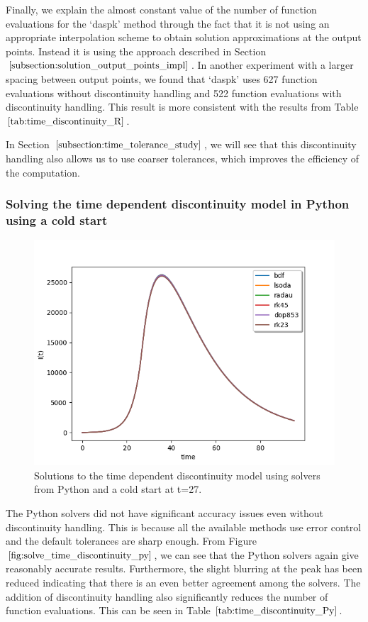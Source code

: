Finally, we explain the almost constant value of the number of function evaluations for the `daspk' method through the fact that it is not using an appropriate interpolation scheme to obtain solution approximations at the output points. Instead it is using the approach described in Section $\ref{subsection:solution_output_points_impl}$. In another experiment with a larger spacing between output points, we found that `daspk' uses 627 function evaluations without discontinuity handling and 522 function evaluations with discontinuity handling. This result is more consistent with the results from Table $\ref{tab:time_discontinuity_R}$.

In Section $\ref{subsection:time_tolerance_study}$, we will see that this discontinuity handling also allows us to use coarser tolerances, which improves the efficiency of the computation.

\subsubsection{Solving the time dependent discontinuity model in Python using a cold start} 
\begin{figure}[H]
\centering
\includegraphics[width=0.7\linewidth]{./figures/solve_time_discontinuity_py}
\caption{Solutions to the time dependent discontinuity model using solvers from Python and a cold start at t=27.}
\label{fig:solve_time_discontinuity_py}
\end{figure}
The Python solvers did not have significant accuracy issues even without discontinuity handling. This is because all the available methods use error control and the default tolerances are sharp enough. From Figure $\ref{fig:solve_time_discontinuity_py}$, we can see that the Python solvers again give reasonably accurate results. Furthermore, the slight blurring at the peak has been reduced indicating that there is an even better agreement among the solvers. The addition of discontinuity handling also significantly reduces the number of function evaluations. This can be seen in Table $\ref{tab:time_discontinuity_Py}$.

